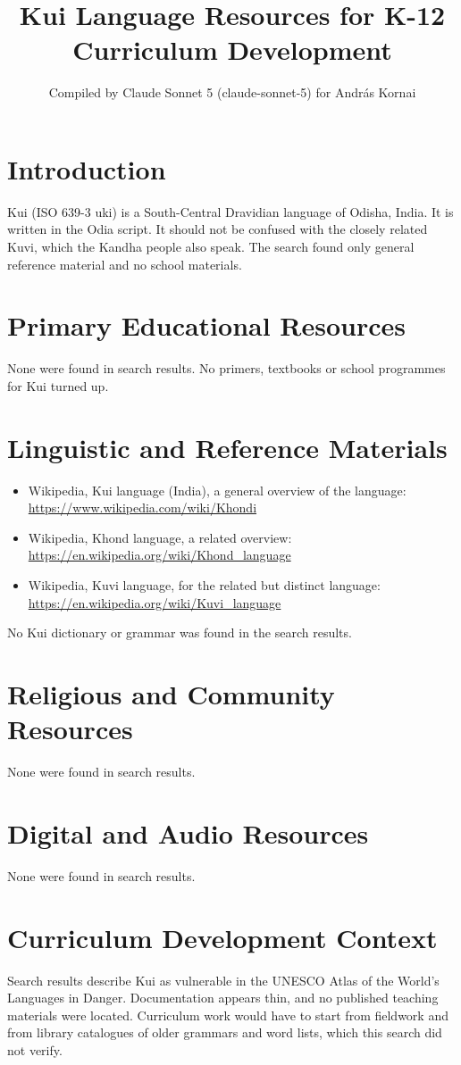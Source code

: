 \documentclass[12pt]{article}
\title{Kui Language Resources for K-12 Curriculum Development}
\author{Compiled by Claude Sonnet 5 (claude-sonnet-5) for Andr\'as Kornai}
\date{}
\begin{document}
\maketitle
\section{Introduction}
Kui (ISO 639-3 uki) is a South-Central Dravidian language of Odisha, India. It is written in the Odia script. It should not be confused with the closely related Kuvi, which the Kandha people also speak. The search found only general reference material and no school materials.
\section{Primary Educational Resources}
None were found in search results. No primers, textbooks or school programmes for Kui turned up.
\section{Linguistic and Reference Materials}
\begin{itemize}
\item Wikipedia, Kui language (India), a general overview of the language: \url{https://www.wikipedia.com/wiki/Khondi}
\item Wikipedia, Khond language, a related overview: \url{https://en.wikipedia.org/wiki/Khond_language}
\item Wikipedia, Kuvi language, for the related but distinct language: \url{https://en.wikipedia.org/wiki/Kuvi_language}
\end{itemize}
No Kui dictionary or grammar was found in the search results.
\section{Religious and Community Resources}
None were found in search results.
\section{Digital and Audio Resources}
None were found in search results.
\section{Curriculum Development Context}
Search results describe Kui as vulnerable in the UNESCO Atlas of the World's Languages in Danger. Documentation appears thin, and no published teaching materials were located. Curriculum work would have to start from fieldwork and from library catalogues of older grammars and word lists, which this search did not verify.
\end{document}
